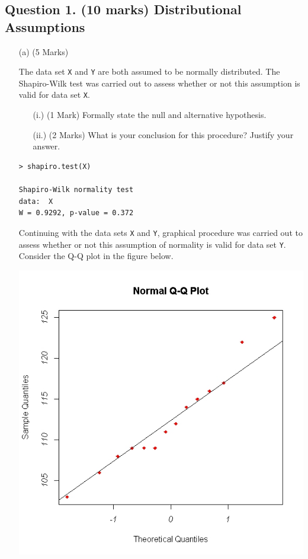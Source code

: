 \documentclass[a4paper,12pt]{article}
\begin{document}
\subsection*{Question 1. (10 marks) Distributional Assumptions}
\begin{itemize}
\item[(a)] (5 Marks) 

The data set \texttt{X} and \texttt{Y} are both assumed to be normally distributed. The Shapiro-Wilk test was carried out to assess whether or not this assumption is valid for data set \texttt{X}.
\begin{itemize}
	\item[(i.)] (1 Mark) Formally state the null and alternative hypothesis.
	\item[(ii.)] (2 Marks) What is your conclusion for this procedure? Justify your answer.
\end{itemize}
\begin{framed}
\begin{verbatim}
> shapiro.test(X)
	
Shapiro-Wilk normality test
data:  X
W = 0.9292, p-value = 0.372
\end{verbatim}
\end{framed}

 Continuing with the data sets \texttt{X} and \texttt{Y}, graphical procedure was carried out to assess whether or not this assumption of normality is valid for data set \texttt{Y}. Consider the Q-Q plot in the figure below.

\begin{center}
	\includegraphics[scale=0.45]{Q5examQQplot}
\end{center}


\end{itemize}
\end{document}
